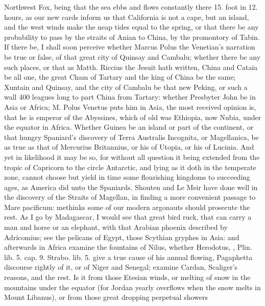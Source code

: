 {Northwest Fox, being that the sea ebbs and flows constantly there 15.
foot in 12. hours, as our new cards inform us that California is
not a cape, but an island, and the west winds make the neap tides equal
to the spring, or that there be any probability to pass by the straits
of Anian to China, by the promontory of Tabin. If there be, I shall
soon perceive whether Marcus Polus the Venetian's narration be
true or false, of that great city of Quinsay and Cambalu; whether there
be any such places, or that as Matth. Riccius the Jesuit hath
written, China and Cataia be all one, the great Cham of Tartary and the
king of China be the same; Xuntain and Quinsay, and the city of Cambalu
be that new Peking, or such a wall 400 leagues long to part China from
Tartary: whether Presbyter John be in Asia or Africa; M. Polus
Venetus puts him in Asia, the most received opinion is, that he
is emperor of the Abyssines, which of old was Ethiopia, now Nubia,
under the equator in Africa. Whether Guinea be an island or part
of the continent, or that hungry Spaniard's discovery of Terra
Australis Incognita, or Magellanica, be as true as that of Mercurius
Britannius, or his of Utopia, or his of Lucinia. And yet in likelihood
it may be so, for without all question it being extended from the
tropic of Capricorn to the circle Antarctic, and lying as it doth in
the temperate zone, cannot choose but yield in time some flourishing
kingdoms to succeeding ages, as America did unto the Spaniards. Shouten
and Le Meir have done well in the discovery of the Straits of Magellan,
in finding a more convenient passage to Mare pacificum: methinks some
of our modern argonauts should prosecute the rest. As I go by
Madagascar, I would see that great bird ruck, that can carry a
man and horse or an elephant, with that Arabian phoenix described by
Adricomius; see the pelicans of Egypt, those Scythian gryphes in
Asia: and afterwards in Africa examine the fountains of Nilus, whether
Herodotus, \Seneca, Plin. lib. 5. cap. 9. Strabo. lib. 5. give a
true cause of his annual flowing, Pagaphetta discourse rightly of
it, or of Niger and Senegal; examine Cardan, Scaliger's reasons,
and the rest. Is it from those Etesian winds, or melting of snow in the
mountains under the equator (for Jordan yearly overflows when the snow
melts in Mount Libanus), or from those great dropping perpetual showers
}
